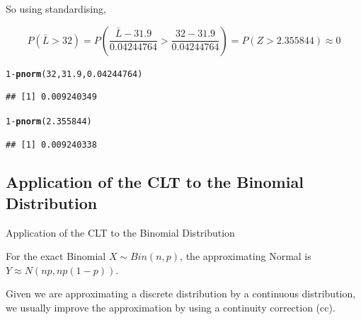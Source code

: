 \documentclass[t,xcolor=pdftex,dvipsnames,table]{beamer}\usepackage[]{graphicx}\usepackage[]{color}
\makeatletter
\newcommand{\hlnum}[1]{\textcolor[rgb]{0.686,0.059,0.569}{#1}}%
\newcommand{\hlopt}[1]{\textcolor[rgb]{0,0,0}{#1}}%
\newcommand{\hlstd}[1]{\textcolor[rgb]{0.345,0.345,0.345}{#1}}%
\newcommand{\hlkwd}[1]{\textcolor[rgb]{0.737,0.353,0.396}{\textbf{#1}}}%
\newenvironment{kframe}{%
 \def\at@end@of@kframe{}%
 \ifinner\ifhmode%
  \def\at@end@of@kframe{\end{minipage}}%
  \begin{minipage}{\columnwidth}%
 \fi\fi%
 \def\FrameCommand##1{\hskip\@totalleftmargin \hskip-\fboxsep
 \colorbox{shadecolor}{##1}\hskip-\fboxsep
     \hskip-\linewidth \hskip-\@totalleftmargin \hskip\columnwidth}%
 \MakeFramed {\advance\hsize-\width
   \@totalleftmargin\z@ \linewidth\hsize
   \@setminipage}}%
 {\par\unskip\endMakeFramed%
 \at@end@of@kframe}
\newenvironment{knitrout}{}{} %
\makeatother
\begin{document}
\begin{frame}[fragile]{}
So using standardising,

\[ P(\bar{L} > 32) = P(\frac{\bar{L}-31.9}{0.04244764} > \frac{32-31.9}{0.04244764}) = P(Z > 2.355844) \approx 0 \]

\begin{knitrout}
\color{fgcolor}\begin{kframe}
\begin{alltt}
\hlnum{1}\hlopt{-}\hlkwd{pnorm}\hlstd{(}\hlnum{32}\hlstd{,}\hlnum{31.9}\hlstd{,}\hlnum{0.04244764}\hlstd{)}
\end{alltt}
\begin{verbatim}
## [1] 0.009240349
\end{verbatim}
\begin{alltt}
\hlnum{1}\hlopt{-}\hlkwd{pnorm}\hlstd{(}\hlnum{2.355844}\hlstd{)}
\end{alltt}
\begin{verbatim}
## [1] 0.009240338
\end{verbatim}
\end{kframe}
\end{knitrout}
\end{frame}



\subsection[CLTBinomial]{Application of the CLT to the Binomial Distribution}

\begin{frame}{Application of the CLT to the Binomial Distribution}

\begin{definition}

For the exact Binomial $X \sim  Bin(n,p)$, the approximating Normal is
$ Y \approx N (np, np(1-p))$.

\vspace{.5cm}
Given we are approximating a discrete distribution by a continuous distribution, we usually improve the approximation by using a continuity correction (cc).
\end{definition}

\end{frame}
\end{document}
